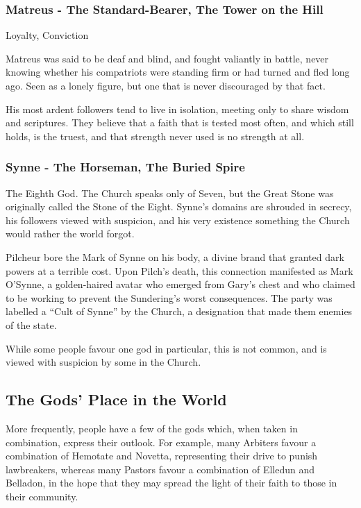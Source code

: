 \subsubsection{Matreus - The Standard-Bearer, The Tower on the Hill}

\vspace{2mm}

Loyalty, Conviction

Matreus was said to be deaf and blind, and fought valiantly in battle, never knowing whether his compatriots were standing firm or had turned and fled long ago. Seen as a lonely figure, but one that is never discouraged by that fact.

His most ardent followers tend to live in isolation, meeting only to share wisdom and scriptures. They believe that a faith that is tested most often, and which still holds, is the truest, and that strength never used is no strength at all.

\subsubsection{Synne - The Horseman, The Buried Spire}

\vspace{2mm}

The Eighth God.  The Church speaks only of Seven, but the Great Stone was originally called the Stone of the Eight.  Synne's domains are shrouded in secrecy, his followers viewed with suspicion, and his very existence something the Church would rather the world forgot.

Pilcheur bore the Mark of Synne on his body, a divine brand that granted dark powers at a terrible cost.  Upon Pilch's death, this connection manifested as Mark O'Synne, a golden-haired avatar who emerged from Gary's chest and who claimed to be working to prevent the Sundering's worst consequences.  The party was labelled a ``Cult of Synne'' by the Church, a designation that made them enemies of the state.

While some people favour one god in particular, this is not common, and is viewed with suspicion by some in the Church.

\subsection*{The Gods' Place in the World}

More frequently, people have a few of the gods which, when taken in combination, express their outlook. For example, many Arbiters favour a combination of Hemotate and Novetta, representing their drive to punish lawbreakers, whereas many Pastors favour a combination of Elledun and Belladon, in the hope that they may spread the light of their faith to those in their community.

